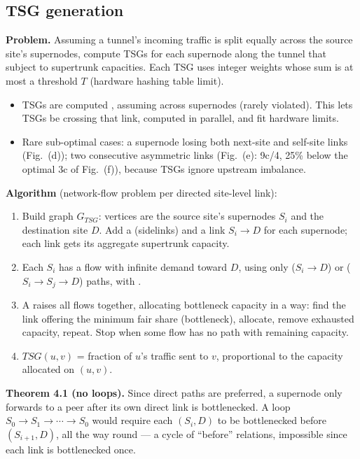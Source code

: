 \subsection{TSG generation}
\textbf{Problem.} Assuming a tunnel's incoming traffic is split equally across the source site's supernodes, compute TSGs for each supernode along the tunnel that  subject to supertrunk capacities. Each TSG uses integer weights whose sum is at most a threshold $T$ (hardware hashing table limit).
\begin{itemize}
\item TSGs are computed , assuming  across supernodes (rarely violated). This lets TSGs be  crossing that link, computed in parallel, and fit hardware limits.
\item Rare sub-optimal cases: a supernode losing both next-site and self-site links (Fig.\ (d)); two consecutive asymmetric links (Fig.\ (e): 9c/4, 25\% below the optimal 3c of Fig.\ (f)), because TSGs ignore upstream imbalance.
\end{itemize}
\textbf{Algorithm} (network-flow problem per directed site-level link):
\begin{enumerate}
\item Build graph $G_{TSG}$: vertices are the source site's supernodes $S_i$ and the destination site $D$. Add a  (sidelinks) and a link $S_i\to D$ for each supernode; each link gets its aggregate supertrunk capacity.
\item Each $S_i$ has a flow with infinite demand toward $D$, using only  ($S_i\to D$) or  ($S_i\to S_j\to D$) paths, with .
\item A  raises all flows together, allocating bottleneck capacity in a  way: find the link offering the minimum fair share (bottleneck), allocate, remove exhausted capacity, repeat. Stop when some flow has no path with remaining capacity.
\item $TSG(u,v)$ = fraction of $u$'s traffic sent to $v$, proportional to the capacity allocated on $(u,v)$.
\end{enumerate}
\textbf{Theorem 4.1 (no loops).} Since direct paths are preferred, a supernode only forwards to a peer after its own direct link is bottlenecked. A loop $S_0\to S_1\to\cdots\to S_0$ would require each $(S_i,D)$ to be bottlenecked before $(S_{i+1},D)$, all the way round --- a cycle of ``before'' relations, impossible since each link is bottlenecked once.

